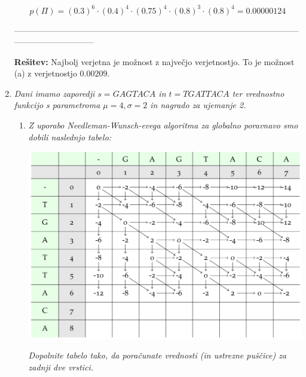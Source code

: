 \documentclass{article}
\begin{document}
\begin{enumerate}
\begin{center}
				$$
				p(\Pi) = (0.3)^6 \cdot (0.4)^4 \cdot (0.75)^4 \cdot (0.8)^3 \cdot (0.8)^4 = 0.00000124
				$$
			\end{center}

			-----------------------------------------------------------------------------------------------------------------------------------

		\textbf{Rešitev:} Najbolj verjetna je možnost z največjo verjetnostjo. To je možnost (a)
		z verjetnostjo $0.00209$.

		\newpage

	\item \textit{Dani imamo zaporedji $s=GAGTACA$ in $t=TGATTACA$ ter vrednostno funkcijo s parametroma
		$\mu = 4, \sigma = 2$ in nagrado za ujemanje 2.}

		\begin{enumerate}
			\item \textit{Z uporabo Needleman-Wunsch-evega algoritma za globalno poravnavo smo dobili
				naslednjo tabelo:}

				\begin{center}
					\includegraphics[scale=0.2]{NW-tabela.png}
				\end{center}

				\textit{Dopolnite tabelo tako, da poračunate vrednosti (in ustrezne puščice) za zadnji dve vrstici.}


\end{enumerate}
\end{enumerate}
\end{document}
